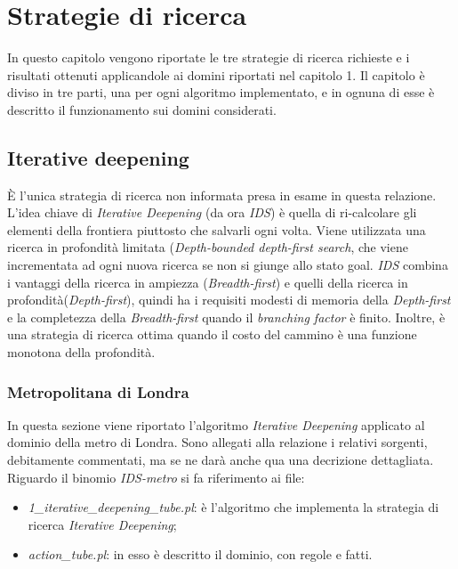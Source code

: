 \documentclass[12pt]{report}
\begin{document}
\chapter{Strategie di ricerca}
In questo capitolo vengono riportate le tre strategie di ricerca richieste e i risultati ottenuti applicandole ai domini riportati nel capitolo 1.
Il capitolo è diviso in tre parti, una per ogni algoritmo implementato, e in ognuna di esse è descritto il funzionamento sui domini considerati.

\section{Iterative deepening}
\`E l'unica strategia di ricerca non informata presa in esame in questa relazione.
L'idea chiave di \emph{Iterative Deepening} (da ora \emph{IDS}) \`e quella di ri-calcolare gli elementi della frontiera piuttosto che salvarli ogni volta. Viene utilizzata una ricerca in profondit\`a limitata (\emph{Depth-bounded depth-first search}, che viene incrementata ad ogni nuova ricerca se non si giunge allo stato goal. \emph{IDS} combina i vantaggi della ricerca in ampiezza (\emph{Breadth-first}) e quelli della ricerca in profondit\`a(\emph{Depth-first}), quindi ha i requisiti modesti di memoria della \emph{Depth-first} e la completezza della \emph{Breadth-first} quando il \emph{branching factor} \`e finito. Inoltre, \`e una strategia di ricerca ottima quando il costo del cammino è una funzione monotona della profondit\`a.

\subsection{Metropolitana di Londra}
In questa sezione viene riportato l'algoritmo \emph{Iterative Deepening} applicato al dominio della metro di Londra.
Sono allegati alla relazione i relativi sorgenti, debitamente commentati, ma se ne dar\`a anche qua una decrizione dettagliata.
Riguardo il binomio \emph{IDS-metro} si fa riferimento ai file:

\begin{itemize}
\item \emph{1\_iterative\_deepening\_tube.pl}: è l'algoritmo che implementa la strategia di ricerca \emph{Iterative Deepening};
\item \emph{action\_tube.pl}: in esso è descritto il dominio, con regole e fatti.
\end{itemize}
\end{document}
